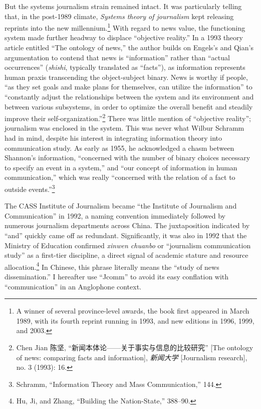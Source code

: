 \documentclass{tufte-handout}
\begin{document}
\begin{CJK*}{UTF8}{gbsn}
But the systems journalism strain remained intact. It was particularly
telling that, in the post-1989 climate, \emph{Systems theory of
journalism} kept releasing reprints into the new millennium.\footnote{A
  winner of several province-level awards, the book first appeared in
  March 1989, with its fourth reprint running in 1993, and new editions
  in 1996, 1999, and 2003.} With regard to news value, the functioning
system made further headway to displace ``objective reality.'' In a 1993
theory article entitled ``The ontology of news,'' the author builds on
Engels's and Qian's argumentation to contend that news is
``information'' rather than ``actual occurrences'' (\emph{shishi},
typically translated as ``facts''), as information represents human
praxis transcending the object-subject binary. News is worthy if people,
``as they set goals and make plans for themselves, can utilize the
information'' to ``constantly adjust the relationships between the
system and its environment and between various subsystems, in order to
optimize the overall benefit and steadily improve their
self-organization.''\footnote{Chen Jian 陈坚,
  ``新闻本体论------关于事实与信息的比较研究'' {[}The ontology of news:
  comparing facts and information{]}, \emph{新闻大学} {[}Journalism
  research{]}, no. 3 (1993): 16.} There was little mention of
``objective reality''; journalism was enclosed in the system. This was
never what Wilbur Schramm had in mind, despite his interest in
integrating information theory into communication study. As early as
1955, he acknowledged a chasm between Shannon's information, ``concerned
with the number of binary choices necessary to specify an event in a
system,'' and ``our concept of information in human communication,''
which was really ``concerned with the relation of a fact to outside
events.''\footnote{Schramm, ``Information Theory and Mass
  Communication,'' 144.}

The CASS Institute of Journalism became ``the Institute of Journalism
and Communication'' in 1992, a naming convention immediately followed by
numerous journalism departments across China. The juxtaposition
indicated by ``and'' quickly came off as redundant. Significantly, it
was also in 1992 that the Ministry of Education confirmed \emph{xinwen
chuanbo} or ``journalism communication study'' as a first-tier
discipline, a direct signal of academic stature and resource
allocation.\footnote{Hu, Ji, and Zhang, ``Building the Nation-State,''
  388--90.} In Chinese, this phrase literally means the ``study of news
dissemination.'' I hereafter use ``Jcomm'' to avoid its easy conflation
with ``communication'' in an Anglophone context.

\end{CJK*}
\end{document}
